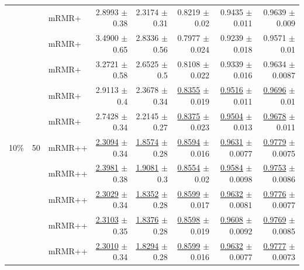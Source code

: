 \begin{longtable}{llp{}rrrrr}
 &  & mRMR+ & 2.8993 {\scriptsize $\pm$ 0.38} & 2.3174 {\scriptsize $\pm$ 0.31} & 0.8219 {\scriptsize $\pm$ 0.02} & 0.9435 {\scriptsize $\pm$ 0.011} & 0.9639 {\scriptsize $\pm$ 0.009} \\
 &  & mRMR+ & 3.4900 {\scriptsize $\pm$ 0.65} & 2.8336 {\scriptsize $\pm$ 0.56} & 0.7977 {\scriptsize $\pm$ 0.024} & 0.9239 {\scriptsize $\pm$ 0.018} & 0.9571 {\scriptsize $\pm$ 0.01} \\
 &  & mRMR+ & 3.2721 {\scriptsize $\pm$ 0.58} & 2.6525 {\scriptsize $\pm$ 0.5} & 0.8108 {\scriptsize $\pm$ 0.022} & 0.9339 {\scriptsize $\pm$ 0.016} & 0.9634 {\scriptsize $\pm$ 0.0087} \\
 &  & mRMR+ & 2.9113 {\scriptsize $\pm$ 0.4} & 2.3678 {\scriptsize $\pm$ 0.34} & \underline{0.8355} {\scriptsize $\pm$ 0.019} & \underline{0.9516} {\scriptsize $\pm$ 0.011} & \underline{0.9696} {\scriptsize $\pm$ 0.01} \\
 &  & mRMR+ & 2.7428 {\scriptsize $\pm$ 0.34} & 2.2145 {\scriptsize $\pm$ 0.27} & \underline{0.8375} {\scriptsize $\pm$ 0.023} & \underline{0.9504} {\scriptsize $\pm$ 0.013} & \underline{0.9678} {\scriptsize $\pm$ 0.011} \\
\midrule
10\% & 50 & mRMR++ & \underline{2.3094} {\scriptsize $\pm$ 0.34} & \underline{1.8574} {\scriptsize $\pm$ 0.28} & \underline{0.8594} {\scriptsize $\pm$ 0.016} & \underline{0.9631} {\scriptsize $\pm$ 0.0077} & \underline{0.9779} {\scriptsize $\pm$ 0.0075} \\
 &  & mRMR++ & \underline{2.3981} {\scriptsize $\pm$ 0.38} & \underline{1.9081} {\scriptsize $\pm$ 0.3} & \underline{0.8554} {\scriptsize $\pm$ 0.02} & \underline{0.9584} {\scriptsize $\pm$ 0.0098} & \underline{0.9753} {\scriptsize $\pm$ 0.0086} \\
 &  & mRMR++ & \underline{2.3029} {\scriptsize $\pm$ 0.34} & \underline{1.8352} {\scriptsize $\pm$ 0.28} & \underline{0.8599} {\scriptsize $\pm$ 0.017} & \underline{0.9632} {\scriptsize $\pm$ 0.0081} & \underline{0.9776} {\scriptsize $\pm$ 0.0077} \\
 &  & mRMR++ & \underline{2.3103} {\scriptsize $\pm$ 0.35} & \underline{1.8376} {\scriptsize $\pm$ 0.28} & \underline{0.8598} {\scriptsize $\pm$ 0.019} & \underline{0.9608} {\scriptsize $\pm$ 0.0092} & \underline{0.9769} {\scriptsize $\pm$ 0.0085} \\
 &  & mRMR++ & \underline{2.3010} {\scriptsize $\pm$ 0.34} & \underline{1.8294} {\scriptsize $\pm$ 0.28} & \underline{0.8599} {\scriptsize $\pm$ 0.016} & \underline{0.9632} {\scriptsize $\pm$ 0.0077} & \underline{0.9777} {\scriptsize $\pm$ 0.0073} \\

\end{longtable}
